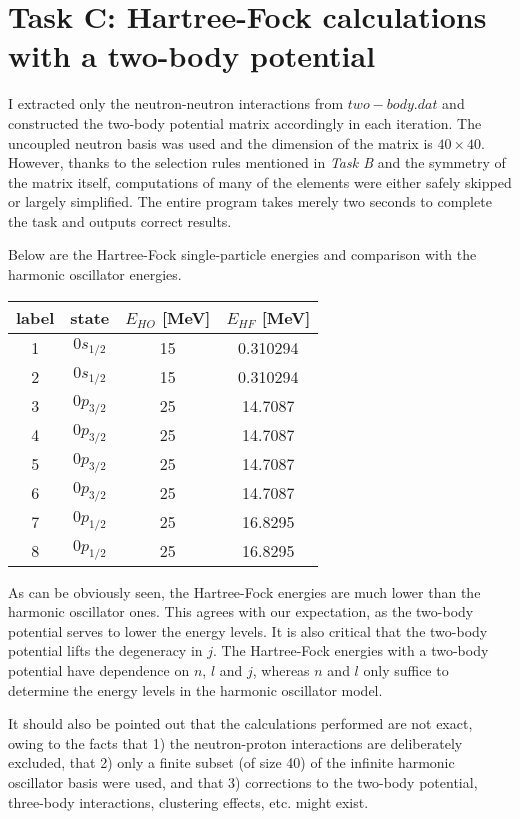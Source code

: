 \documentclass[11pt, oneside]{article}   	%
\begin{document}
\section{Task C: Hartree-Fock calculations with a two-body potential}
I extracted only the neutron-neutron interactions from $two-body.dat$ and constructed the two-body potential matrix accordingly in each iteration. The uncoupled neutron basis was used and the dimension of the matrix is $40\times40$. However, thanks to the selection rules mentioned in \emph{Task B} and the symmetry of the matrix itself, computations of many of the elements were either safely skipped or largely simplified. The entire program takes merely two seconds to complete the task and outputs correct results.

Below are the Hartree-Fock single-particle energies and comparison with the harmonic oscillator energies.
\begin{table}[H]
  \centering
\begin{tabular}{cccc}
  \toprule
	label & state & \textit{$E_{HO}$} [MeV] & \textit{$E_{HF}$} [MeV] \\
  \midrule
	1 & $0s_{1/2}$ & 15 & 0.310294 \\
	2 & $0s_{1/2}$ & 15 & 0.310294 \\
	3 & $0p_{3/2}$ & 25 & 14.7087 \\
	4 & $0p_{3/2}$ & 25 & 14.7087 \\
	5 & $0p_{3/2}$ & 25 & 14.7087 \\
	6 & $0p_{3/2}$ & 25 & 14.7087 \\
	7 & $0p_{1/2}$ & 25 & 16.8295 \\
	8 & $0p_{1/2}$ & 25 & 16.8295 \\    
	\bottomrule
  \end{tabular}
\end{table}

As can be obviously seen, the Hartree-Fock energies are much lower than the harmonic oscillator ones. This agrees with our expectation, as the two-body potential serves to lower the energy levels. It is also critical that the two-body potential lifts the degeneracy in $j$. The Hartree-Fock energies with a two-body potential have dependence on $n$, $l$ and $j$, whereas $n$ and $l$ only suffice to determine the energy levels in the harmonic oscillator model.

It should also be pointed out that the calculations performed are not exact, owing to the facts that 1) the neutron-proton interactions are deliberately excluded, that 2) only a finite subset (of size 40) of the infinite harmonic oscillator basis were used, and that 3) corrections to the two-body potential, three-body interactions, clustering effects, etc. might exist.
\end{document}
